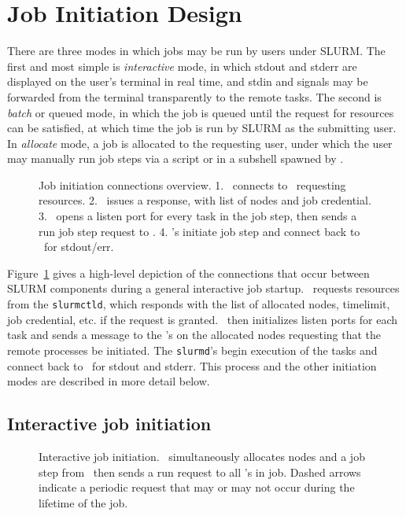 \section{Job Initiation Design}

There are three modes in which jobs may be run by users under SLURM. The
first and most simple is {\em interactive} mode, in which stdout and
stderr are displayed on the user's terminal in real time, and stdin and
signals may be forwarded from the  terminal transparently to the remote
tasks. The second is {\em batch} or {queued} mode, in which the job is
queued until the request for resources can be satisfied, at which time the
job is run by SLURM as the submitting user. In {\em allocate} mode,
a job is allocated to the requesting user, under which the user may
manually run job steps via a script or in a subshell spawned by \srun .

\begin{figure}[tb]
\centerline{}
\caption{\small Job initiation connections overview. 1. \srun\ connects to 
         \slurmctld\ requesting resources. 2. \slurmctld\ issues a response,
	 with list of nodes and job credential. 3. \srun\ opens a listen
	 port for every task in the job step, then sends a run job step
	 request to \slurmd . 4. \slurmd 's initiate job step and connect
	 back to \srun\ for stdout/err. }
\label{connections}
\end{figure}

Figure~\ref{connections} gives a high-level depiction of the connections
that occur between SLURM components during a general interactive job
startup. \srun\ requests resources from the {\tt slurmctld}, which 
responds with the list of allocated nodes, timelimit, job credential, etc.
if the request is granted. \srun\ then initializes listen ports for each
task and sends a message to the \slurmd 's on the allocated nodes requesting
that the remote processes be initiated. The {\tt slurmd}'s begin execution of
the tasks and connect back to \srun\ for stdout and stderr. This process and
the other initiation modes are described in more detail below.

\subsection{Interactive job initiation}

\begin{figure}[tb]
\centerline{ }
\caption{\small Interactive job initiation. \srun\ simultaneously allocates
nodes
         and a job step from \slurmctld\ then sends a run request to all
	 \slurmd 's in job. Dashed arrows indicate a periodic request that
	 may or may not occur during the lifetime of the job.}
\label{init-interactive}
\end{figure}

